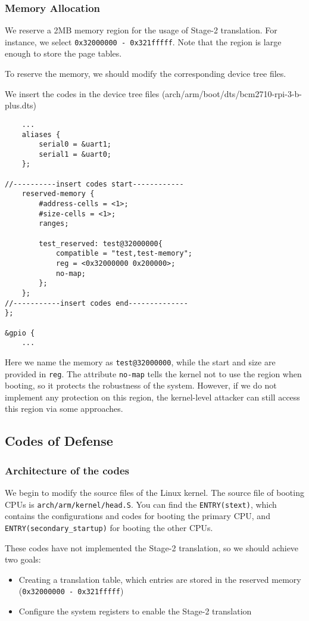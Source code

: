 \subsubsection{Memory Allocation}

We reserve a 2MB memory region for the usage of Stage-2 translation. For instance, we select \texttt{0x32000000 - 0x321fffff}. Note that the region is large enough to store the page tables.

To reserve the memory, we should modify the corresponding device tree files.

We insert the codes in the device tree files (arch/arm/boot/dts/bcm2710-rpi-3-b-plus.dts)
\begin{lstlisting}
	...
	aliases {
		serial0 = &uart1;
		serial1 = &uart0;
	};

//----------insert codes start------------
	reserved-memory {
		#address-cells = <1>;
		#size-cells = <1>;
		ranges;
		
		test_reserved: test@32000000{
			compatible = "test,test-memory";
			reg = <0x32000000 0x200000>;
			no-map;
		};
	};
//-----------insert codes end--------------
};

&gpio {
	...
\end{lstlisting}

Here we name the memory as \texttt{test@32000000}, while the start and size are provided in \texttt{reg}. The attribute \texttt{no-map} tells the kernel not to use the region when booting, so it protects the robustness of the system. However, if we do not implement any protection on this region, the kernel-level attacker can still access this region via some approaches.

\subsection{Codes of Defense}

\subsubsection{Architecture of the codes}

We begin to modify the source files of the Linux kernel. The source file of booting CPUs is \texttt{arch/arm/kernel/head.S}. You can find the \texttt{ENTRY(stext)}, which contains the configurations and codes for booting the primary CPU, and \texttt{ENTRY(secondary\_startup)} for booting the other CPUs. 

These codes have not implemented the Stage-2 translation, so we should achieve two goals: 
\begin{itemize}
	\item Creating a translation table, which entries are stored in the reserved memory (\texttt{0x32000000 - 0x321fffff})
	\item Configure the system registers to enable the Stage-2 translation
\end{itemize}

